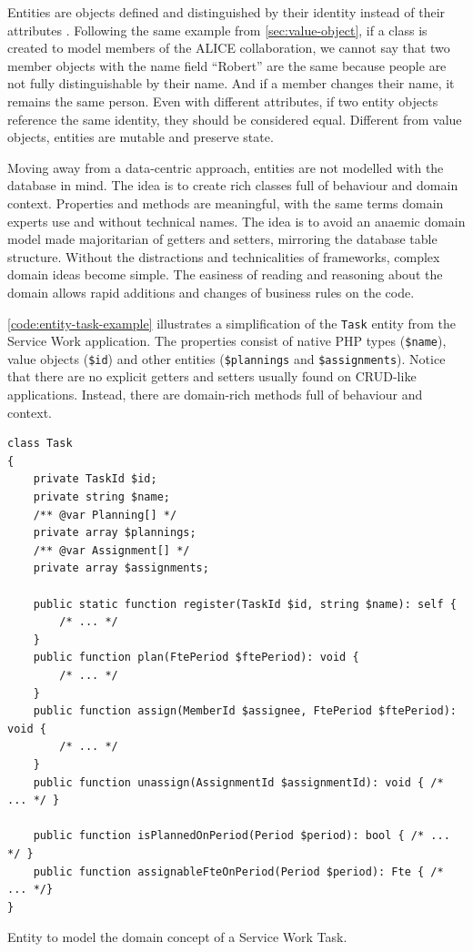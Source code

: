 Entities are objects defined and distinguished by their identity instead of their attributes \cite{ddd-blue-book}. Following the same example from \autoref{sec:value-object}, if a class is created to model members of the ALICE collaboration, we cannot say that two member objects with the name field “Robert” are the same because people are not fully distinguishable by their name. And if a member changes their name, it remains the same person. Even with different attributes, if two entity objects reference the same identity, they should be considered equal. Different from value objects, entities are mutable and preserve state.

Moving away from a data-centric approach, entities are not modelled with the database in mind. The idea is to create rich classes full of behaviour and domain context. Properties and methods are meaningful, with the same terms domain experts use and without technical names. The idea is to avoid an anaemic domain model \cite{ddd-blue-book} \cite{martin-fowler-anemic-domian-model} made majoritarian of getters and setters, mirroring the database table structure. Without the distractions and technicalities of frameworks, complex domain ideas become simple. The easiness of reading and reasoning about the domain allows rapid additions and changes of business rules on the code.

\autoref{code:entity-task-example} illustrates a simplification of the \texttt{Task} entity from the Service Work application. The properties consist of native PHP types (\texttt{\$name}), value objects (\texttt{\$id}) and other entities (\texttt{\$plannings} and \texttt{\$assignments}). Notice that there are no explicit getters and setters usually found on CRUD-like applications. Instead, there are domain-rich methods full of behaviour and context.

\begin{listing}[htbp]
\begin{verbatim}
class Task
{
	private TaskId $id;
	private string $name;
	/** @var Planning[] */
	private array $plannings;
	/** @var Assignment[] */
	private array $assignments;

	public static function register(TaskId $id, string $name): self {
        /* ... */
    }
	public function plan(FtePeriod $ftePeriod): void {
        /* ... */
    }
	public function assign(MemberId $assignee, FtePeriod $ftePeriod): void {
        /* ... */
    }
	public function unassign(AssignmentId $assignmentId): void { /* ... */ }

	public function isPlannedOnPeriod(Period $period): bool { /* ... */ }
	public function assignableFteOnPeriod(Period $period): Fte { /* ... */}
}
\end{verbatim}
\caption{Entity to model the domain concept of a Service Work Task.}
\label{code:entity-task-example}
\end{listing}


